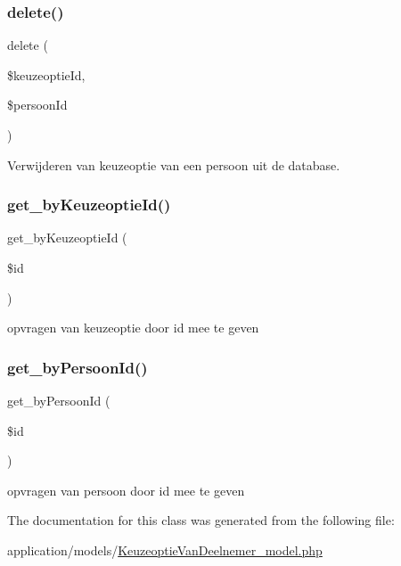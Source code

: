 \subsubsection{\texorpdfstring{delete()}{delete()}}
{\footnotesize\ttfamily delete (\begin{DoxyParamCaption}\item[{}]{\$keuzeoptie\+Id,  }\item[{}]{\$persoon\+Id }\end{DoxyParamCaption})}



Verwijderen van keuzeoptie van een persoon uit de database. 

\mbox{\label{class_keuzeoptie_van_deelnemer___model_a5240031a73a1db935718f12ab29d80ad}} 
\subsubsection{\texorpdfstring{get\+\_\+by\+Keuzeoptie\+Id()}{get\_byKeuzeoptieId()}}
{\footnotesize\ttfamily get\+\_\+by\+Keuzeoptie\+Id (\begin{DoxyParamCaption}\item[{}]{\$id }\end{DoxyParamCaption})}



opvragen van keuzeoptie door id mee te geven 

\mbox{\label{class_keuzeoptie_van_deelnemer___model_aa04bd86e024fed6b73b051c9cbb9ec52}} 
\subsubsection{\texorpdfstring{get\+\_\+by\+Persoon\+Id()}{get\_byPersoonId()}}
{\footnotesize\ttfamily get\+\_\+by\+Persoon\+Id (\begin{DoxyParamCaption}\item[{}]{\$id }\end{DoxyParamCaption})}



opvragen van persoon door id mee te geven 



The documentation for this class was generated from the following file\+:\begin{DoxyCompactItemize}
\item 
application/models/\mbox{\hyperlink{_keuzeoptie_van_deelnemer__model_8php}{Keuzeoptie\+Van\+Deelnemer\+\_\+model.\+php}}\end{DoxyCompactItemize}
